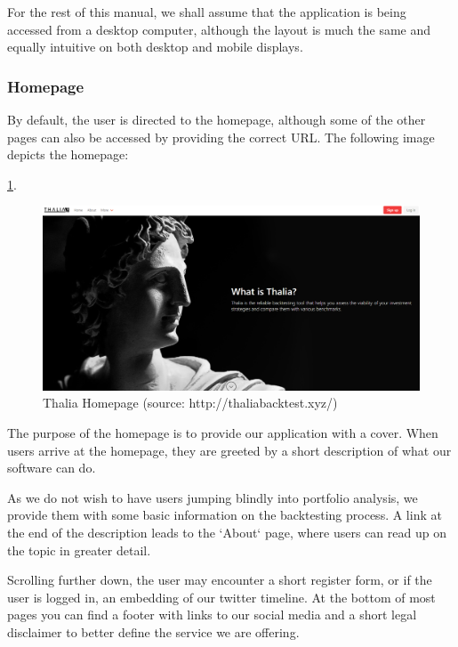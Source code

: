 \documentclass[main.tex]{subfiles}
\begin{document}
For the rest of this manual, we shall assume that the application is being accessed from a desktop computer, although the layout is much the same and equally intuitive on both desktop and mobile displays.

\subsubsection{Homepage}
By default, the user is directed to the homepage, although some of the other pages can also be accessed by providing the correct URL. The following image depicts the homepage:

\figurename{\ref{thalia_home}}.
\begin{figure}[H]
   \centering
   \includegraphics[width=\textwidth]{08Appendices/081User/081Pictures/homepage.png}
   \caption{Thalia Homepage (source: http://thaliabacktest.xyz/)}
   \label{thalia_home}
\end{figure}

The purpose of the homepage is to provide our application with a cover. When users arrive at the homepage, they are greeted by a short description of what our software can do.

As we do not wish to have users jumping blindly into portfolio analysis, we provide them with some basic information on the backtesting process. A link at the end of the description leads to the `About` page, where users can read up on the topic in greater detail.

Scrolling further down, the user may encounter a short register form, or if the user is logged in, an embedding of our twitter timeline. At the bottom of most pages you can find a footer with links to our social media and a short legal disclaimer to better define the service we are offering.
\end{document}
